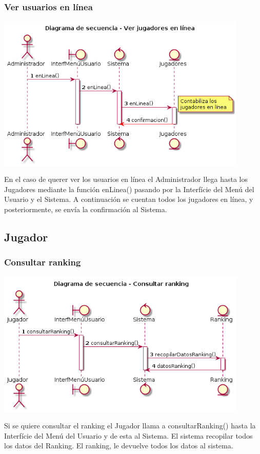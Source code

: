 \subsubsection{Ver usuarios en línea}
\begin{center}
  \includegraphics[width=0.9\textwidth]{./imatges/administrador/Ver_usuarios_en_linea.png}
  \end{center}
	En el caso de querer ver los usuarios en línea el Administrador llega hasta los Jugadores mediante la función enLinea() pasando por la Interfície del Menú del Usuario y el Sistema. A continuación se cuentan todos los jugadores en línea, y posteriormente, se envía la confirmación al Sistema.


\subsection{Jugador}\label{sec:uc0}
\subsubsection{Consultar ranking}
\begin{center}
  \includegraphics[width=0.9\textwidth]{./imatges/jugador/Consultar_ranking.png}
  \end{center}
  Si se quiere consultar el ranking el Jugador llama a consultarRanking() hasta la Interfície del Menú del Usuario y de esta al Sistema. El sistema recopilar todos los datos del Ranking. El ranking, le devuelve todos los datos al sistema.

